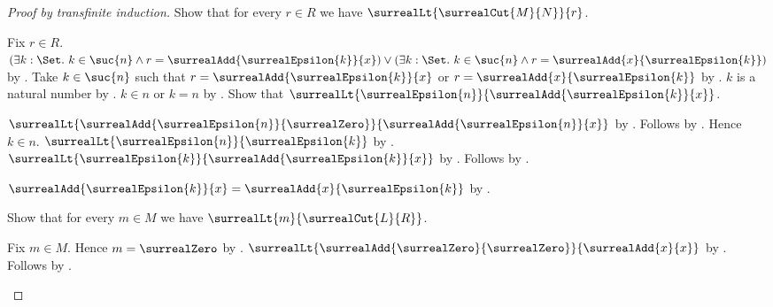 \begin{proof}[Proof by transfinite induction]
    Show that for every $r\in R$ we have
        $\surrealLt{\surrealCut{M}{N}}{r}$.
    \begin{subproof}
        Fix $r\in R$.
        $(\exists k:\Set.\ k\in\suc{n}\land
                r=\surrealAdd{\surrealEpsilon{k}}{x})
            \lor
            (\exists k:\Set.\ k\in\suc{n}\land
                r=\surrealAdd{x}{\surrealEpsilon{k}})$
            by .
        Take $k\in\suc{n}$ such that
            $r=\surrealAdd{\surrealEpsilon{k}}{x}$ or
            $r=\surrealAdd{x}{\surrealEpsilon{k}}$ by \auto.
        $k$ is a natural number
            by .
        $k\in n$ or $k=n$ by .
        Show that
            $\surrealLt{\surrealEpsilon{n}}
                {\surrealAdd{\surrealEpsilon{k}}{x}}$.
        \begin{subproof}
            \begin{byCase}
                    $\surrealLt
                        {\surrealAdd{\surrealEpsilon{n}}{\surrealZero}}
                        {\surrealAdd{\surrealEpsilon{n}}{x}}$
                        by .
                    Follows by
                        .
                    Hence $k\in n$.
                    $\surrealLt{\surrealEpsilon{n}}{\surrealEpsilon{k}}$
                        by .
                    $\surrealLt{\surrealEpsilon{k}}
                        {\surrealAdd{\surrealEpsilon{k}}{x}}$
                        by .
                    Follows by
                        .
            \end{byCase}
        \end{subproof}
        $\surrealAdd{\surrealEpsilon{k}}{x}
            =\surrealAdd{x}{\surrealEpsilon{k}}$
            by .
    \end{subproof}

    Show that for every $m\in M$ we have
        $\surrealLt{m}{\surrealCut{L}{R}}$.
    \begin{subproof}
        Fix $m\in M$.
        Hence $m=\surrealZero$ by .
        $\surrealLt
            {\surrealAdd{\surrealZero}{\surrealZero}}
            {\surrealAdd{x}{x}}$
            by .
        Follows by
            .
    \end{subproof}


\end{proof}
